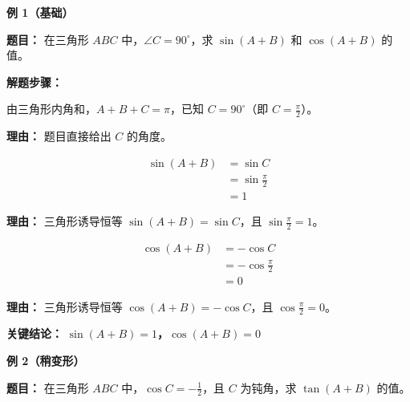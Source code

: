 \begin{examplebox}
	\textbf{\textcolor{CExample}{例 1（基础）}}

	\textbf{\textcolor{CExample}{题目：}}
	在三角形 $ABC$ 中，$\angle C = 90^\circ$，求 $\sin(A+B)$ 和 $\cos(A+B)$ 的值。

	\textbf{\textcolor{CExample}{解题步骤：}}
	\begin{description}[style=nextline, leftmargin=2.8em, labelsep=0.5em, itemsep=0.45em]
		\item[\textbf{第一步（识别条件）：}] 由三角形内角和，$A+B+C=\pi$，已知 $C=90^\circ$（即 $C=\frac{\pi}{2}$）。
			\par\textbf{理由：} 题目直接给出 $C$ 的角度。
		\item[\textbf{第二步（应用正弦公式）：}]
			\[
				\begin{aligned}
					\sin(A+B) &= \sin C \\
					&= \sin\frac{\pi}{2} \\
					&= 1
			\end{aligned}
			\]
			\par\textbf{理由：} 三角形诱导恒等 $\sin(A+B)=\sin C$，且 $\sin\frac{\pi}{2}=1$。
		\item[\textbf{第三步（应用余弦公式）：}]
			\[
				\begin{aligned}
					\cos(A+B) &= -\cos C \\
					&= -\cos\frac{\pi}{2} \\
					&= 0
			\end{aligned}
			\]
			\par\textbf{理由：} 三角形诱导恒等 $\cos(A+B)=-\cos C$，且 $\cos\frac{\pi}{2}=0$。
	\end{description}

	\textbf{\textcolor{CExample}{关键结论：}}
	\textbf{$\sin(A+B)=1$，$\cos(A+B)=0$}

	\medskip
	\textbf{\textcolor{CExample}{例 2（稍变形）}}

	\textbf{\textcolor{CExample}{题目：}}
	在三角形 $ABC$ 中，$\cos C = -\frac12$，且 $C$ 为钝角，求 $\tan(A+B)$ 的值。


\end{examplebox}
